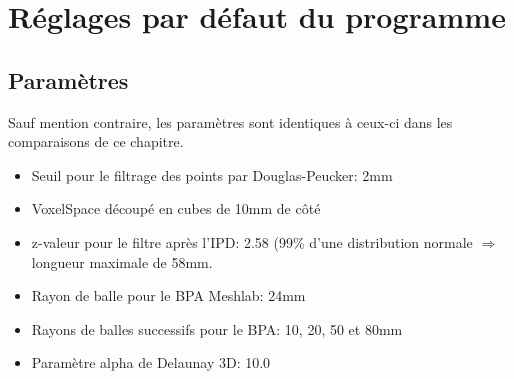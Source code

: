 \documentclass[a4paper,10pt]{report}
\begin{document}
\section{Réglages par défaut du programme}
\subsection{Paramètres}
Sauf mention contraire, les paramètres sont identiques à ceux-ci dans les comparaisons de ce chapitre.

\begin{itemize}
	\item Seuil pour le filtrage des points par Douglas-Peucker: 2mm
    \item VoxelSpace découpé en cubes de 10mm de côté
    \item z-valeur pour le filtre après l'IPD: 2.58 (99\% d'une distribution normale $\Rightarrow$ longueur maximale de 58mm.
    \item Rayon de balle pour le BPA Meshlab: 24mm
    \item Rayons de balles successifs pour le BPA: 10, 20, 50 et 80mm
    \item Paramètre alpha de Delaunay 3D: 10.0
\end{itemize}
\end{document}

